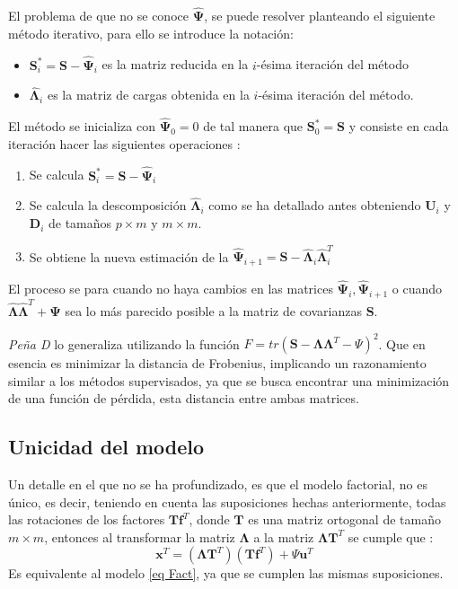 \noindent El problema de que no se conoce $\mathbf{\hat{\Psi}}$, se puede resolver planteando el siguiente método iterativo, para ello se introduce la notación:
\begin{itemize}
\item $\mathbf{S}_i^*=\mathbf{S}-\hat{\mathbf{\Psi}}_i$ es la matriz reducida en la $i$-ésima iteración del método
\item $\mathbf{\hat{\Lambda}}_i$ es la matriz de cargas obtenida en la $i$-ésima iteración del método. 
\end{itemize}
\noindent El método se inicializa con $\mathbf{\hat{\Psi}}_0=0$ de tal manera que $\mathbf{S}_0^*=\mathbf{S}$ y consiste en cada iteración hacer las siguientes operaciones \cite{Johnson 2007, Peña 2002, Cuadras 2014}: 
\begin{enumerate}
\item Se calcula $\mathbf{S}_i^*=\mathbf{S-\hat{\Psi}}_i$
\item Se calcula la descomposición $\mathbf{\hat{\Lambda}}_i$ como se ha detallado antes obteniendo $\mathbf{U}_i$ y $\mathbf{D}_i$ de tamaños $p\times m $ y $m\times m$. 
\item Se obtiene la nueva estimación de la $\mathbf{\hat{\Psi}}_{i+1}=\mathbf{S}-\mathbf{\hat{\Lambda}}_i\mathbf{\hat{\Lambda}}_i^T$
\end{enumerate}

\noindent El proceso se para cuando no haya cambios en las matrices $\mathbf{\hat{\Psi}}_i,\mathbf{\hat{\Psi}}_{i+1}$ o cuando $\mathbf{\hat{\Lambda}}\mathbf{\hat{\Lambda}}^T+\mathbf{\Psi}$ sea lo más parecido posible a la matriz de covarianzas $\mathbf{S}$.

\noindent \emph{Peña D} \cite{Peña 2002} lo generaliza utilizando la función $F=tr(\mathbf{S}-\mathbf{\Lambda}\mathbf{\Lambda}^T-\Psi)^2$. Que en esencia es minimizar la distancia de Frobenius, implicando un razonamiento similar a los métodos supervisados, ya que se busca encontrar una minimización de una función de pérdida, esta distancia entre ambas matrices. 


\subsection{Unicidad del modelo}

\noindent Un detalle en el que no se ha profundizado, es que el modelo factorial, no es único, es decir, teniendo en cuenta las suposiciones hechas anteriormente, todas las rotaciones de los factores $\mathbf{Tf}^T$, donde $\mathbf{T}$ es una matriz ortogonal de tamaño $m\times m$, entonces al transformar la matriz $\mathbf{\Lambda}$ a la matriz $\mathbf{\Lambda T}^T$ se cumple que \cite{Mardia 1979}:
\begin{equation}
\mathbf{x}^T=(\mathbf{\Lambda T}^T)(\mathbf{Tf}^T)+\Psi\mathbf{u}^T
\end{equation}
\noindent Es equivalente al modelo \ref{eq Fact}, ya que se cumplen las mismas suposiciones. 

